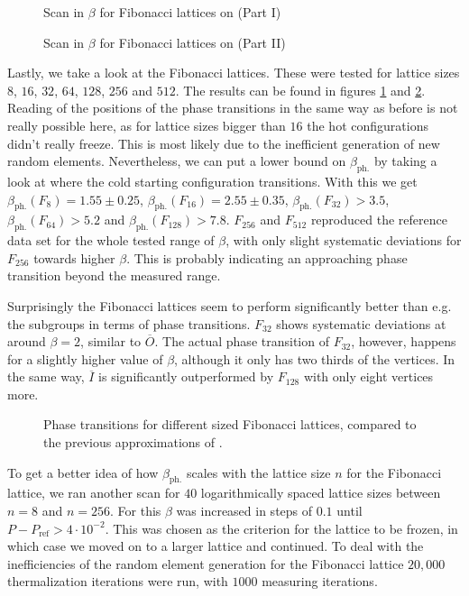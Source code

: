 \begin{figure}[!hbt]
 \centering
 
 \caption{Scan in $\beta$ for Fibonacci lattices on \SUTwo (Part I)}
 \label{plot:fibonacciI}
\end{figure}
\begin{figure}[!hbt]
 \centering
 
 \caption{Scan in $\beta$ for Fibonacci lattices on \SUTwo (Part II)}
 \label{plot:fibonacciII}
\end{figure}

Lastly, we take a look at the Fibonacci lattices. These were tested for lattice sizes  $8$, $16$, $32$, $64$, $128$, $256$ and $512$. The results can be found in figures \ref{plot:fibonacciI} and \ref{plot:fibonacciII}. Reading of the positions of the phase transitions in the same way as before is not really possible here, as for lattice sizes bigger than $16$ the hot configurations didn't really freeze. This is most likely due to the inefficient generation of new random elements. Nevertheless, we can put a lower bound on $\beta_{\textrm{ph.}}$ by taking a look at where the cold starting configuration transitions. With this we get $\beta_{\textrm{ph.}}(F_8) = 1.55 \pm 0.25$, $\beta_{\textrm{ph.}}(F_{16}) = 2.55 \pm 0.35 $, $\beta_{\textrm{ph.}}(F_{32}) > 3.5 $, $\beta_{\textrm{ph.}}(F_{64}) > 5.2 $ and $\beta_{\textrm{ph.}}(F_{128}) > 7.8$. $F_{256}$ and $F_{512}$ reproduced the reference data set for the whole tested range of $\beta$, with only slight systematic deviations for $F_{256}$ towards higher $\beta$. This is probably indicating an approaching phase transition beyond the measured range.

Surprisingly the Fibonacci lattices seem to perform significantly better than e.g. the subgroups in terms of phase transitions. $F_{32}$ shows systematic deviations at around $\beta = 2$, similar to $\overline{O}$. The actual phase transition of $F_{32}$, however, happens for a slightly higher value of $\beta$, although it only has two thirds of the vertices. In the same way, $\overline{I}$ is significantly outperformed by $F_{128}$ with only eight vertices more. \\

\begin{figure}[!hbt]
 \centering
 
 \caption{Phase transitions for different sized Fibonacci lattices, compared to the previous approximations of \SUTwo.}
 \label{plot:fibPhaseScan}
\end{figure}

To get a better idea of how $\beta_{\textrm{ph.}}$ scales with the lattice size $n$ for the Fibonacci lattice, we ran another scan for $40$ logarithmically spaced lattice sizes between $n=8$ and $n=256$. For this $\beta$ was increased in steps of $0.1$ until $P-P_{\textrm{ref}} > 4 \cdot 10^{-2}$. This was chosen as the criterion for the lattice to be frozen, in which case we moved on to a larger lattice and continued. To deal with the inefficiencies of the random element generation for the Fibonacci lattice $20,000$ thermalization iterations were run, with $1000$ measuring iterations.

